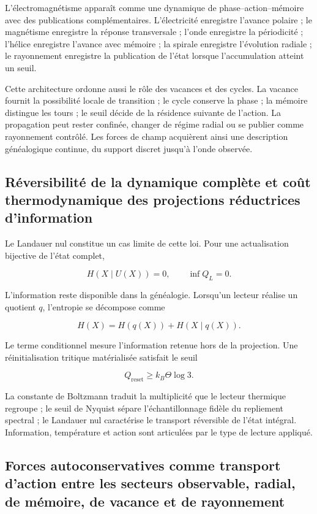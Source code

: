 L'électromagnétisme apparaît comme une dynamique de phase–action–mémoire avec des publications complémentaires. L'électricité enregistre l'avance polaire ; le magnétisme enregistre la réponse transversale ; l'onde enregistre la périodicité ; l'hélice enregistre l'avance avec mémoire ; la spirale enregistre l'évolution radiale ; le rayonnement enregistre la publication de l'état lorsque l'accumulation atteint un seuil.

Cette architecture ordonne aussi le rôle des vacances et des cycles. La vacance fournit la possibilité locale de transition ; le cycle conserve la phase ; la mémoire distingue les tours ; le seuil décide de la résidence suivante de l'action. La propagation peut rester confinée, changer de régime radial ou se publier comme rayonnement contrôlé. Les forces de champ acquièrent ainsi une description généalogique continue, du support discret jusqu'à l'onde observée.

\subsection{Réversibilité de la dynamique complète et coût thermodynamique des projections réductrices d'information}
Le Landauer nul constitue un cas limite de cette loi. Pour une actualisation bijective de l'état complet,

\[
H(X\mid U(X))=0,
\qquad
\inf Q_L=0.
\]

L'information reste disponible dans la généalogie. Lorsqu'un lecteur réalise un quotient \(q\), l'entropie se décompose comme

\[
H(X)=H(q(X))+H(X\mid q(X)).
\]

Le terme conditionnel mesure l'information retenue hors de la projection. Une réinitialisation tritique matérialisée satisfait le seuil

\[
Q_{\mathrm{reset}}\ge k_B\Theta\log 3.
\]

La constante de Boltzmann traduit la multiplicité que le lecteur thermique regroupe ; le seuil de Nyquist sépare l'échantillonnage fidèle du repliement spectral ; le Landauer nul caractérise le transport réversible de l'état intégral. Information, température et action sont articulées par le type de lecture appliqué.

\subsection{Forces autoconservatives comme transport d'action entre les secteurs observable, radial, de mémoire, de vacance et de rayonnement}

